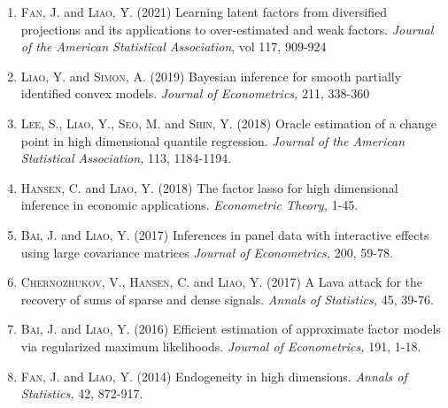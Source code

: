 \documentclass[11pt]{article}
\begin{document}
\begin{enumerate}
 
 		   

 \item  \textsc{Fan, J.} and    \textsc{\textsc{Liao, Y.}}  (2021)  	 Learning latent factors from diversified projections and its applications to over-estimated and weak factors. {\it   Journal of the American Statistical Association}, vol 117, 909-924





\item     \textsc{\textsc{Liao, Y.}} and \textsc{Simon, A.} (2019)  Bayesian inference for smooth partially identified convex models.  {\it  {Journal of Econometrics},}  211, 338-360
 







\item     \textsc{Lee, S., \textsc{Liao, Y.}, Seo, M.} and \textsc{Shin, Y.} (2018)  Oracle estimation of a change point in high dimensional quantile regression.  {\it  {Journal of the American Statistical Association},}  { 113}, 1184-1194. 
 

  \item   \textsc{Hansen, C.}  and \textsc{\textsc{Liao, Y.}}  (2018) The factor lasso for high dimensional inference in economic applications.   {\it  { Econometric Theory},     } 1-45.
 
 
  \item   \textsc{Bai, J.}  and \textsc{\textsc{Liao, Y.}}  (2017) Inferences in panel data with interactive effects using large covariance matrices    {\it  { Journal of Econometrics},    }
 {200}, 59-78.


\item  \textsc{Chernozhukov, V., Hansen, C.}  and \textsc{\textsc{Liao, Y.}} (2017)  A Lava attack for the recovery of sums of sparse and dense signals.  {\it  { Annals of Statistics},  }    {45}, 39-76.



  \item   \textsc{Bai, J.}  and \textsc{\textsc{Liao, Y.}}  (2016) Efficient estimation of approximate factor models via regularized maximum likelihoods.      {\it  { Journal of Econometrics},    }
 {191}, 1-18.




\item   \textsc{Fan, J.} and \textsc{\textsc{Liao, Y.}} (2014) Endogeneity in high dimensions. {\it  { Annals of Statistics},  }    {42}, 872-917.


\end{enumerate}
\end{document}
